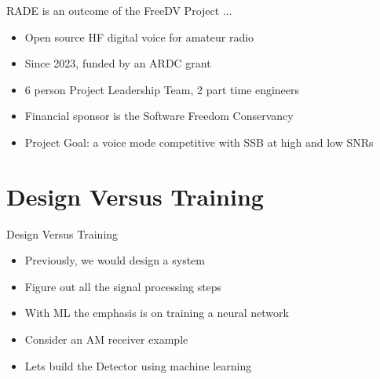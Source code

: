 \documentclass{beamer}
\begin{document}
\begin{frame}
RADE is an outcome of the FreeDV Project ...
\begin{itemize}
    \item Open source HF digital voice for amateur radio
    \item Since 2023, funded by an ARDC grant
    \item 6 person Project Leadership Team, 2 part time engineers
    \item Financial sponsor is the Software Freedom Conservancy
    \item Project Goal: a voice mode competitive with SSB at high and low SNRs
\end{itemize}
\end{frame}

\section{Design Versus Training}

\begin{frame}{Design Versus Training}

\begin{itemize}
	\item Previously, we would design a system
	\item Figure out all the signal processing steps
	\item With ML the emphasis is on training a neural network
	\item Consider an AM receiver example
	\item Lets build the Detector using machine learning
\end{itemize}

\vspace{5mm}


\end{frame}
\end{document}
